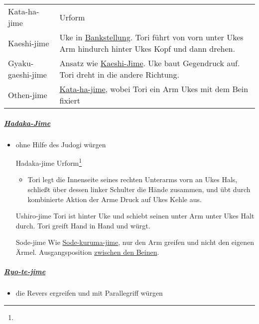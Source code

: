 \documentclass[justified, a4paper, notitlepage, captions=tableheading, nobib]{tufte-handout}
\begin{document}
\begin{center}
\begin{tabular}{ll}
\label{org947d943}Kata-ha-jime & Urform\footnotemark\\
\label{org4174005}Kaeshi-jime & Uke in \hyperref[org9811981]{Bankstellung}. Tori führt von vorn unter Ukes Arm hindurch hinter Ukes Kopf und dann drehen.\\
\label{org922bfbf}Gyaku-gaeshi-jime & Ansatz wie \hyperref[org4174005]{Kaeshi-Jime}. Uke baut Gegendruck auf. Tori dreht in die andere Richtung.\\
\label{org0e75f04}Othen-jime & \hyperref[org947d943]{Kata-ha-jime}, wobei Tori ein Arm Ukes mit dem Bein fixiert\\
\end{tabular}
\end{center}

\subparagraph{\hyperref[orgddc1c5d]{Hadaka-Jime}}
\label{sec:orgc5df079}
\begin{itemize}
\item ohne Hilfe des Judogi würgen
\item[{\label{orgddc1c5d}Hadaka-jime}] Urform\footnote{}                                                                                            
\begin{itemize}
\item Tori legt die Innenseite seines rechten Unterarms vorn an Ukes Hals, schließt über dessen linker Schulter die Hände zusammen, und übt durch kombinierte Aktion der Arme Druck auf Ukes Kehle aus.
\end{itemize}
\item[{\label{org987c76a}Ushiro-jime}] Tori ist hinter Uke und schiebt seinen unter Arm unter Ukes Halt durch. Tori greift Hand in Hand und würgt.
\item[{\label{org3c0b440}Sode-jime  }] Wie \hyperref[orgca7fe31]{Sode-kuruma-jime}, nur den Arm greifen und nicht den eigenen Ärmel. Ausgangsposition \hyperref[orge217f65]{zwischen den Beinen}.
\end{itemize}

\subparagraph{\hyperref[org96abec7]{Ryo-te-jime}}
\label{sec:org8529e78}
\begin{itemize}
\item die Revers ergreifen und mit Parallegriff würgen
\end{itemize}
\end{document}
